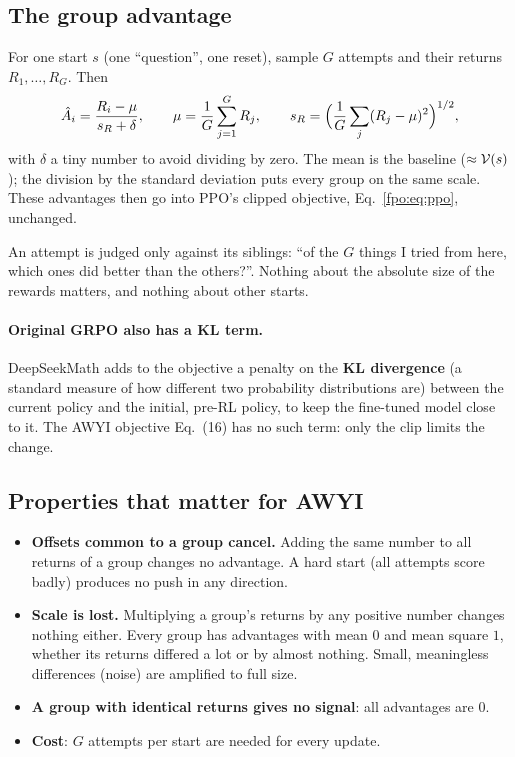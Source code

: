 \subsection{The group advantage}
For one start $s$ (one ``question'', one reset), sample $G$ attempts and their returns $R_1,\dots,R_G$. Then
\begin{equation}
\hat A_i=\frac{R_i-\mu}{s_R+\delta},\qquad\mu=\frac1G\sum_{j=1}^{G}R_j,\qquad s_R=\Big(\frac1G\sum_j(R_j-\mu)^2\Big)^{1/2},
\label{fpo:eq:grpo-adv}
\end{equation}
with $\delta$ a tiny number to avoid dividing by zero. The mean is the baseline ($\approx\mathcal{V}(s)$); the division by the standard deviation puts every group on the same scale. These advantages then go into PPO's clipped objective, Eq.~\eqref{fpo:eq:ppo}, unchanged.

\begin{intuition}
An attempt is judged only against its siblings: ``of the $G$ things I tried from here, which ones did better than the others?''. Nothing about the absolute size of the rewards matters, and nothing about other starts.
\end{intuition}

\paragraph{Original GRPO also has a KL term.} DeepSeekMath adds to the objective a penalty on the \textbf{KL divergence} (a standard measure of how different two probability distributions are) between the current policy and the initial, pre-RL policy, to keep the fine-tuned model close to it. The AWYI objective Eq.~(16) has no such term: only the clip limits the change.

\subsection{Properties that matter for AWYI}
\begin{itemize}
\item \textbf{Offsets common to a group cancel.} Adding the same number to all returns of a group changes no advantage. A hard start (all attempts score badly) produces no push in any direction.
\item \textbf{Scale is lost.} Multiplying a group's returns by any positive number changes nothing either. Every group has advantages with mean $0$ and mean square $1$, whether its returns differed a lot or by almost nothing. Small, meaningless differences (noise) are amplified to full size.
\item \textbf{A group with identical returns gives no signal}: all advantages are $0$.
\item \textbf{Cost}: $G$ attempts per start are needed for every update.
\end{itemize}

